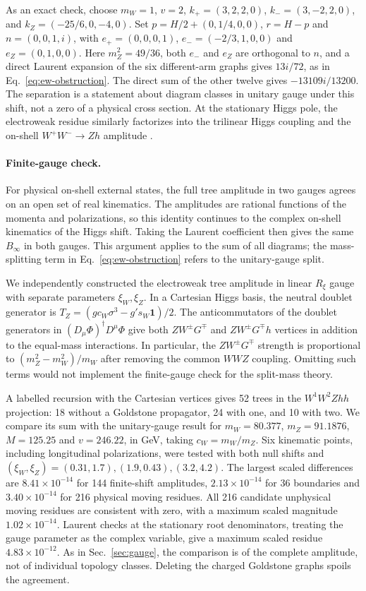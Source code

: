 \documentclass[11pt,a4paper]{article}
\begin{document}
As an exact check, choose \(m_W=1\), \(v=2\),
\(k_+=(3,2,2,0)\), \(k_-=(3,-2,2,0)\), and
\(k_Z=(-25/6,0,-4,0)\). Set \(p=H/2+(0,1/4,0,0)\), \(r=H-p\)
and \(n=(0,0,1,i)\), with
\(e_+=(0,0,0,1)\), \(e_-=(-2/3,1,0,0)\) and \(e_Z=(0,1,0,0)\).
Here \(m_Z^2=49/36\), both \(e_-\) and \(e_Z\) are orthogonal to
\(n\), and a direct Laurent expansion of the six different-arm
graphs gives \(13i/72\), as in Eq.~\eqref{eq:ew-obstruction}.
The direct sum of the other twelve gives \(-13109i/13200\).
The separation is a statement about diagram classes in unitary
gauge under this shift, not a zero of a physical cross section.
At the stationary Higgs pole, the electroweak residue similarly
factorizes into the trilinear Higgs coupling and the on-shell
\(W^+W^-\to Zh\) amplitude \cite[Sec.~4.3]{Bachu}.

\paragraph{Finite-gauge check.}
For physical on-shell external states, the full tree amplitude in
two gauges agrees on an open set of real kinematics. The amplitudes
are rational functions of the momenta and polarizations, so this
identity continues to the complex on-shell kinematics of the
Higgs shift. Taking the Laurent coefficient then gives the same
\(B_\infty\) in both gauges. This argument applies to the sum of
all diagrams; the mass-splitting term in
Eq.~\eqref{eq:ew-obstruction} refers to the unitary-gauge split.

We independently constructed the electroweak tree amplitude in
linear \(R_\xi\) gauge with separate parameters \(\xi_W,\xi_Z\).
In a Cartesian Higgs basis, the neutral doublet generator is
\(T_Z=(g c_W\sigma^3-g's_W\mathbf{1})/2\).
The anticommutators of the doublet generators in
\((D_\mu\Phi)^\dagger D^\mu\Phi\) give both \(ZW^\pm G^\mp\)
and \(ZW^\pm G^\mp h\) vertices in addition to the equal-mass
interactions. In particular, the \(ZW^\pm G^\mp\) strength is
proportional to \((m_Z^2-m_W^2)/m_W\) after removing the common
\(WWZ\) coupling. Omitting such terms would not implement the
finite-gauge check for the split-mass theory.

A labelled recursion with the Cartesian vertices gives 52 trees
in the \(W^1W^2Zhh\) projection: 18 without a Goldstone propagator,
24 with one, and 10 with two. We compare its sum with the
unitary-gauge result for \(m_W=80.377\), \(m_Z=91.1876\),
\(M=125.25\) and \(v=246.22\), in GeV, taking \(c_W=m_W/m_Z\).
Six kinematic points, including longitudinal polarizations,
were tested with both null shifts and
\((\xi_W,\xi_Z)=(0.31,1.7),(1.9,0.43),(3.2,4.2)\).
The largest scaled differences are \(8.41\times10^{-14}\) for
144 finite-shift amplitudes, \(2.13\times10^{-14}\) for
36 boundaries and \(3.40\times10^{-14}\) for 216 physical
moving residues. All 216 candidate unphysical moving residues
are consistent with zero, with a maximum scaled magnitude
\(1.02\times10^{-14}\). Laurent checks at the stationary
root denominators, treating the gauge parameter as the
complex variable, give a maximum scaled residue
\(4.83\times10^{-12}\). As in Sec.~\ref{sec:gauge},
the comparison is of the complete amplitude, not of
individual topology classes. Deleting the charged
Goldstone graphs spoils the agreement.
\end{document}
